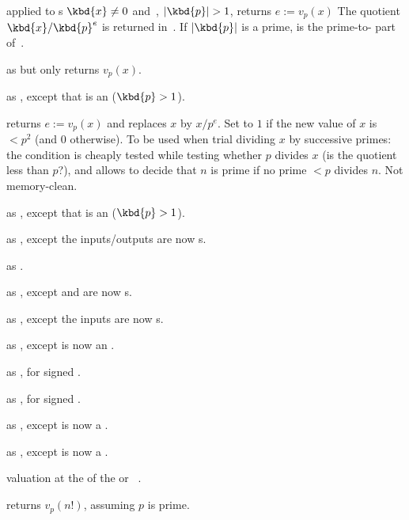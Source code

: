  applied to s
$\kbd{x}\neq 0$ and~, $|\kbd{p}| > 1$, returns $e := v_p(x)$
The quotient $\kbd{x}/\kbd{p}^e$ is returned in~. If
$|\kbd{p}|$ is a prime,  is the prime-to- part of~.

 as  but only returns
$v_p(x)$.

 as ,
except that  is an  ($\kbd{p} > 1$).

 returns $e := v_p(x)$
and replaces $x$ by $x / p^e$. Set  to $1$ if the new value
of $x$ is $ < p^2$ (and $0$ otherwise). To be used when trial dividing $x$
by successive primes: the  condition is cheaply tested while
testing whether $p$ divides $x$ (is the quotient less than $p$?), and allows
to decide that $n$ is prime if no prime $< p$ divides $n$. Not memory-clean.

 as ,
except that  is an  ($\kbd{p} > 1$).

 as ,
except the inputs/outputs are now s.

 as
.

 as ,
except  and  are now s.

 as ,
except the inputs are now s.

 as ,
except  is now an .

 as , for signed .

 as , for signed .

 as ,
except  is now a .

 as ,
except  is now a .

 valuation at the  
of the  or ~.

 returns $v_p(n!)$, assuming
$p$ is prime.



